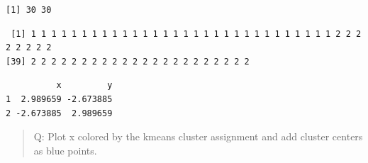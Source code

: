 \documentclass[
  letterpaper,
  DIV=11,
  numbers=noendperiod]{scrartcl}
\newenvironment{Shaded}{\begin{snugshade}}{\end{snugshade}}
\newcommand{\AttributeTok}[1]{\textcolor[rgb]{0.40,0.45,0.13}{#1}}
\newcommand{\CommentTok}[1]{\textcolor[rgb]{0.37,0.37,0.37}{#1}}
\newcommand{\DecValTok}[1]{\textcolor[rgb]{0.68,0.00,0.00}{#1}}
\newcommand{\FunctionTok}[1]{\textcolor[rgb]{0.28,0.35,0.67}{#1}}
\newcommand{\NormalTok}[1]{\textcolor[rgb]{0.00,0.23,0.31}{#1}}
\newcommand{\OtherTok}[1]{\textcolor[rgb]{0.00,0.23,0.31}{#1}}
\newcommand{\SpecialCharTok}[1]{\textcolor[rgb]{0.37,0.37,0.37}{#1}}
\newcommand{\StringTok}[1]{\textcolor[rgb]{0.13,0.47,0.30}{#1}}
\begin{document}
\begin{Shaded}
\end{Shaded}

\begin{verbatim}
[1] 30 30
\end{verbatim}

\begin{Shaded}
\end{Shaded}

\begin{verbatim}
 [1] 1 1 1 1 1 1 1 1 1 1 1 1 1 1 1 1 1 1 1 1 1 1 1 1 1 1 1 1 1 1 2 2 2 2 2 2 2 2
[39] 2 2 2 2 2 2 2 2 2 2 2 2 2 2 2 2 2 2 2 2 2 2
\end{verbatim}

\begin{Shaded}
\end{Shaded}

\begin{verbatim}
          x         y
1  2.989659 -2.673885
2 -2.673885  2.989659
\end{verbatim}

\begin{quote}
Q: Plot x colored by the kmeans cluster assignment and add cluster
centers as blue points.
\end{quote}

\begin{Shaded}
\end{Shaded}
\end{document}
